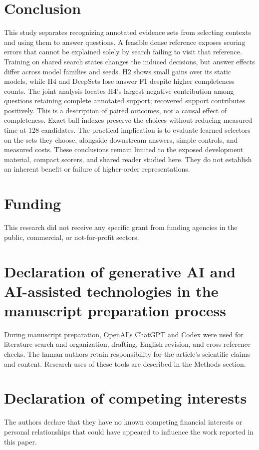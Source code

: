 \documentclass[preprint,12pt]{elsarticle}
\begin{document}
\section{Conclusion}
This study separates recognizing annotated evidence sets from selecting contexts and using them to answer questions. A feasible dense reference exposes scoring errors that cannot be explained solely by search failing to visit that reference. Training on shared search states changes the induced decisions, but answer effects differ across model families and seeds. H2 shows small gains over its static models, while H4 and DeepSets lose answer F1 despite higher completeness counts. The joint analysis locates H4's largest negative contribution among questions retaining complete annotated support; recovered support contributes positively. This is a description of paired outcomes, not a causal effect of completeness. Exact ball indexes preserve the choices without reducing measured time at 128 candidates. The practical implication is to evaluate learned selectors on the sets they choose, alongside downstream answers, simple controls, and measured costs. These conclusions remain limited to the exposed development material, compact scorers, and shared reader studied here. They do not establish an inherent benefit or failure of higher-order representations.

\ifdefined\WithAuthors

\fi

\section*{Funding}
This research did not receive any specific grant from funding agencies in the public, commercial, or not-for-profit sectors.

\section*{Declaration of generative AI and AI-assisted technologies in the manuscript preparation process}
During manuscript preparation, OpenAI's ChatGPT and Codex were used for literature search and organization, drafting, English revision, and cross-reference checks. The human authors retain responsibility for the article's scientific claims and content. Research uses of these tools are described in the Methods section.

\section*{Declaration of competing interests}
The authors declare that they have no known competing financial interests or personal relationships that could have appeared to influence the work reported in this paper.
\end{document}
